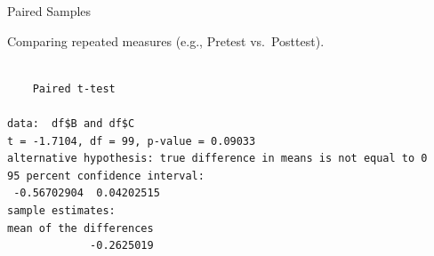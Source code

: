 \begin{frame}[fragile]{Paired Samples}

\center
Comparing repeated measures (e.g., Pretest vs.~Posttest).

\begin{Shaded}
\begin{Highlighting}[]
\OperatorTok{$}\OperatorTok{$} \NormalTok{)}
\end{Highlighting}
\end{Shaded}

\begin{verbatim}

    Paired t-test

data:  df$B and df$C
t = -1.7104, df = 99, p-value = 0.09033
alternative hypothesis: true difference in means is not equal to 0
95 percent confidence interval:
 -0.56702904  0.04202515
sample estimates:
mean of the differences 
             -0.2625019 
\end{verbatim}

\end{frame}

